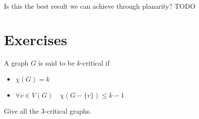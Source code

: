\documentclass[a4paper, 12pt]{report}
\begin{document}
    Is this the best result we can achieve through planarity? TODO 

    \section{Exercises}

    \begin{framedprob}{}
        A graph $G$ is said to be $k$-critical if
        
        \begin{itemize}
            \item $\chi(G) = k$
            \item $\forall v \in V(G) \quad \chi(G - \{v\}) \le k - 1$
        \end{itemize}

        Give all the 3-critical graphs.
    \end{framedprob}
    
\end{document}

